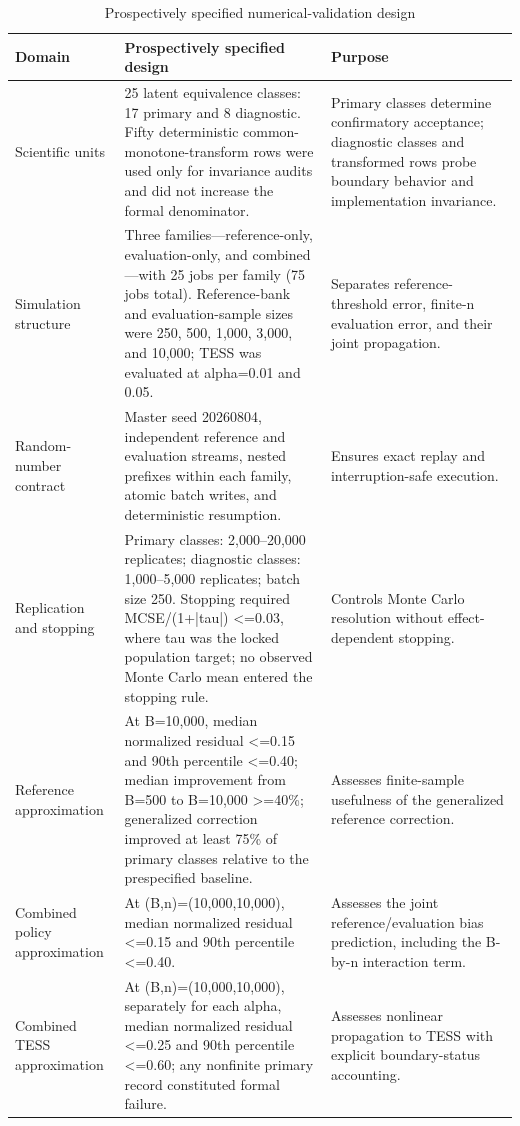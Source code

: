 \begin{table}[htbp]
\centering
\caption{Prospectively specified numerical-validation design}
\label{tab:validation-design}
\begin{tabularx}{\textwidth}{p{} X X}
\toprule
Domain & Prospectively specified design & Purpose \\
\midrule
Scientific units & 25 latent equivalence classes: 17 primary and 8 diagnostic. Fifty deterministic common-monotone-transform rows were used only for invariance audits and did not increase the formal denominator. & Primary classes determine confirmatory acceptance; diagnostic classes and transformed rows probe boundary behavior and implementation invariance. \\
Simulation structure & Three families—reference-only, evaluation-only, and combined—with 25 jobs per family (75 jobs total). Reference-bank and evaluation-sample sizes were 250, 500, 1,000, 3,000, and 10,000; TESS was evaluated at alpha=0.01 and 0.05. & Separates reference-threshold error, finite-n evaluation error, and their joint propagation. \\
Random-number contract & Master seed 20260804, independent reference and evaluation streams, nested prefixes within each family, atomic batch writes, and deterministic resumption. & Ensures exact replay and interruption-safe execution. \\
Replication and stopping & Primary classes: 2,000–20,000 replicates; diagnostic classes: 1,000–5,000 replicates; batch size 250. Stopping required MCSE/(1+|tau|) <=0.03, where tau was the locked population target; no observed Monte Carlo mean entered the stopping rule. & Controls Monte Carlo resolution without effect-dependent stopping. \\
Reference approximation & At B=10,000, median normalized residual <=0.15 and 90th percentile <=0.40; median improvement from B=500 to B=10,000 >=40\%; generalized correction improved at least 75\% of primary classes relative to the prespecified baseline. & Assesses finite-sample usefulness of the generalized reference correction. \\
Combined policy approximation & At (B,n)=(10,000,10,000), median normalized residual <=0.15 and 90th percentile <=0.40. & Assesses the joint reference/evaluation bias prediction, including the B-by-n interaction term. \\
Combined TESS approximation & At (B,n)=(10,000,10,000), separately for each alpha, median normalized residual <=0.25 and 90th percentile <=0.60; any nonfinite primary record constituted formal failure. & Assesses nonlinear propagation to TESS with explicit boundary-status accounting. \\

\end{tabularx}
\end{table}
